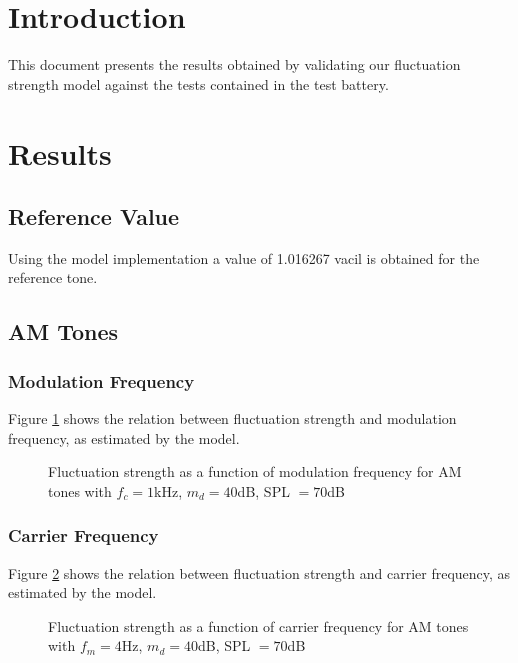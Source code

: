 \documentclass[a4paper]{article}
\begin{document}

\section{Introduction}

This document presents the results obtained by validating our fluctuation
strength model against the tests contained in the test battery.

\section{Results}

\subsection{Reference Value}

Using the model implementation a value of 1.016267 vacil is obtained for the
reference tone.

\subsection{AM Tones}

\subsubsection{Modulation Frequency}

Figure \ref{fig:AMtonesfmplot} shows the relation between fluctuation strength
and modulation frequency, as estimated by the model.

\begin{figure}[ht]
    \centering
    \resizebox{!}{8cm}{
        
    }
    \caption{Fluctuation strength as a function of modulation frequency for AM
        tones with $f_c = 1 $kHz, $m_d = 40 $dB, SPL $= 70 $dB}
    \label{fig:AMtonesfmplot}
\end{figure}

\subsubsection{Carrier Frequency}

Figure \ref{fig:AMtonesfcplot} shows the relation between fluctuation strength
and carrier frequency, as estimated by the model.

\begin{figure}[ht]
    \centering
    \resizebox{!}{8cm}{
        
    }
    \caption{Fluctuation strength as a function of carrier frequency for AM
        tones with $f_m = 4 $Hz, $m_d = 40 $dB, SPL $= 70 $dB}
    \label{fig:AMtonesfcplot}
\end{figure}
\end{document}
